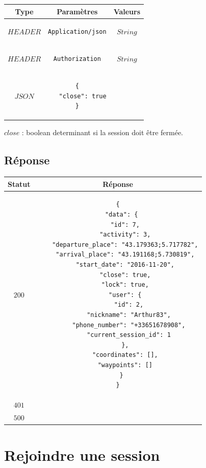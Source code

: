 \documentclass[titlepage, 12pt]{report}
\begin{document}
\begin{center}
	\begin{tabular}{|c|c|c|}
	\hline
	Type & Paramètres & Valeurs \\
	\hline
	$ HEADER $ & 
	\begin{lstlisting}
Application/json
	\end{lstlisting} &
	$ String $ \\ \hline
	$ HEADER $ & 
	\begin{lstlisting}
Authorization
	\end{lstlisting} &
	$ String $ \\ \hline
	$ JSON $ & 
	\begin{lstlisting}
{
   "close": true
}
	\end{lstlisting} & \makecell{$  boolean $} \\ 
	\hline
	
	\end{tabular}
\end{center}

\par $ close $ : boolean determinant si la session doit être fermée.

\subsection{Réponse}

\begin{center}
	\begin{tabular}{|c|c|}
		\hline
		Statut & Réponse \\
		\hline
		$ 200 $ & \begin{lstlisting}
{
  "data": {
    "id": 7,
    "activity": 3,
    "departure_place": "43.179363;5.717782",
    "arrival_place": "43.191168;5.730819",
    "start_date": "2016-11-20",
    "close": true,
    "lock": true,
    "user": {
      "id": 2,
      "nickname": "Arthur83",
      "phone_number": "+33651678908",
      "current_session_id": 1
    },
    "coordinates": [],
    "waypoints": []
  }
}
		\end{lstlisting} \\ 
		\hline
		$ 401 $ & \\
		\hline
		$ 500 $ & \\
		\hline
	\end{tabular}
\end{center}

%
%

\section{Rejoindre une session}
\end{document}

